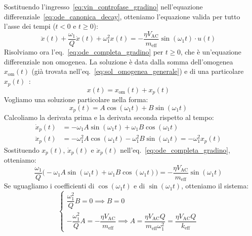 \documentclass[11pt,a4paper]{article}
\begin{document}
\vspace{0.3cm}
\noindent Sostituendo l'ingresso~\eqref{eq:vin_controfase_gradino} nell'equazione differenziale~\eqref{eq:ode_canonica_decay}, otteniamo l'equazione valida per tutto l'asse dei tempi ($t < 0$ e $t \ge 0$):
\begin{equation}
    \label{eq:ode_completa_gradino}
    \ddot{x}(t) + \frac{\omega_1}{Q} \dot{x}(t) + \omega_1^2 x(t) = -\frac{\eta V_{\text{AC}}}{m_{\text{eff}}} \sin(\omega_1 t) \cdot u(t)
\end{equation}
Risolviamo ora l'eq.~\eqref{eq:ode_completa_gradino} per $t \ge 0$, che è un'equazione differenziale non omogenea. La soluzione è data dalla somma dell'omogenea $x_{\text{om}}(t)$ (già trovata nell'eq.~\eqref{eq:sol_omogenea_generale}) e di una particolare $x_p(t)$~\cite{wu2021}:
\begin{equation}
    \label{eq:somma_om_part}
    x(t) = x_{\text{om}}(t) + x_p(t)
\end{equation}
Vogliamo una soluzione particolare nella forma:
\begin{equation}
    x_p(t) = A \cos(\omega_1 t) + B \sin(\omega_1 t)
\end{equation}
Calcoliamo la derivata prima e la derivata seconda rispetto al tempo:
\begin{align}
    \dot{x}_p(t) &= -\omega_1 A \sin(\omega_1 t) + \omega_1 B \cos(\omega_1 t) \\[4pt]
    \ddot{x}_p(t) &= -\omega_1^2 A \cos(\omega_1 t) - \omega_1^2 B \sin(\omega_1 t) = -\omega_1^2 x_p(t)
\end{align}
Sostituendo $x_p(t)$, $\dot{x}_p(t)$ e $\ddot{x}_p(t)$ nell'eq.~\eqref{eq:ode_completa_gradino}, otteniamo:
\begin{equation}
    \frac{\omega_1}{Q} \Big( -\omega_1 A \sin(\omega_1 t) + \omega_1 B \cos(\omega_1 t) \Big) = -\frac{\eta V_{\text{AC}}}{m_{\text{eff}}} \sin(\omega_1 t)
\end{equation}
Se uguagliamo i coefficienti di $\cos(\omega_1 t)$ e di $\sin(\omega_1 t)$, otteniamo il sistema:
\begin{equation}
    \begin{cases}
        \dfrac{\omega_1^2}{Q} B = 0 \implies B = 0 \\[10pt]
        -\dfrac{\omega_1^2}{Q} A = -\dfrac{\eta V_{\text{AC}}}{m_{\text{eff}}} \implies A = \dfrac{\eta V_{\text{AC}} Q}{m_{\text{eff}} \omega_1^2} = \dfrac{\eta V_{\text{AC}} Q}{k_{\text{eff}}}
    \end{cases}
\end{equation}
\end{document}
